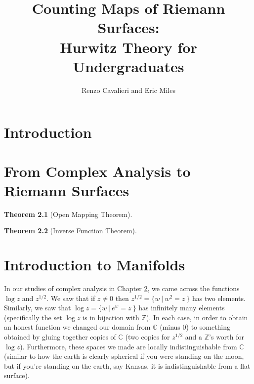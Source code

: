 \documentclass[12pt]{book}%
\theoremstyle{plain}
\newtheorem{theorem}{Theorem}[section]
\theoremstyle{definition}
\theoremstyle{remark}
\def\bC{{\mathbb{C}}}
\def\bZ{{\mathbb{Z}}}
\begin{document}
\title{Counting Maps of Riemann Surfaces: \\ Hurwitz Theory for Undergraduates}

\author{Renzo Cavalieri and Eric Miles}

\date{}

\maketitle




\tableofcontents


\chapter{Introduction}
\label{introduction}

\chapter{From Complex Analysis to Riemann Surfaces}
\label{complexAnalysis}

\begin{theorem}[Open Mapping Theorem]
\label{openMappingThm}
\end{theorem}

\begin{theorem}[Inverse Function Theorem]
\label{inverseFunctionThm}
\end{theorem}



\chapter{Introduction to Manifolds}
\label{manifolds}

In our studies of complex analysis in Chapter \ref{complexAnalysis}, we came across the functions $\log z$ and $z^{1/2}$. We saw that if $z\neq0$ then $z^{1/2} = \{ w\ |\ w^2 = z\ \}$ has two elements. Similarly, we saw that $\log z = \{ w\ |\ e^w=z\ \}$ has infinitely many elements (specifically the set $\log z$ is in bijection with $\bZ$). In each case, in order to obtain an honest function we changed our domain from $\bC$ (minus 0) to something obtained by gluing together copies of $\bC$ (two copies for $z^{1/2}$ and a $\bZ$'s worth for $\log z$). Furthermore, these spaces we made are locally indistinguishable from $\bC$ (similar to how the earth is clearly spherical if you were standing on the moon, but if you're standing on the earth, say Kansas, it is indistinguishable from a flat surface).
\end{document}

